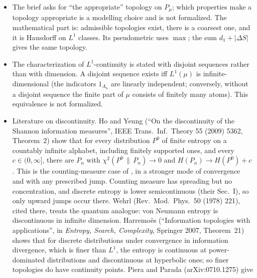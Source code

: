 \documentclass[11pt]{article}
\begin{document}
\begin{itemize}
  mixture $(\rho, \sigma) \mapsto (\rho+\sigma)/2$ is continuous. That is weaker than the
  brief's hypothesis that all mixing is continuous, so the formal statement is stronger. The
   forms take the brief's hypothesis literally, reading ``statistical
  mixing (e.g.\ $(\lambda, \rho, \sigma) \mapsto \lambda\rho + (1-\lambda)\sigma$)'' as this
  map $[0, 1] \times P_\mu \times P_\mu \to P_\mu$ (), with the product
  topology. They follow by fixing $\lambda = \tfrac12$.
\item The brief asks for ``the appropriate'' topology on $P_\mu$; which properties make a
  topology appropriate is a modelling choice and is not formalized. The mathematical part is:
  admissible topologies exist, there is a coarsest one, and it is Hausdorff on $L^1$ classes.
  Its pseudometric uses $\max$; the sum $d_1 + |\Delta S|$ gives the same topology.
\item The characterization of $L^1$-continuity is stated with disjoint sequences rather than
  with dimension. A disjoint sequence exists iff $L^1(\mu)$ is infinite-dimensional (the
  indicators $1_{A_n}$ are linearly independent; conversely, without a disjoint sequence the
  finite part of $\mu$ consists of finitely many atoms). This equivalence is not formalized.
\item Literature on discontinuity. Ho and Yeung (``On the discontinuity of the Shannon
  information measures'', IEEE Trans.\ Inf.\ Theory 55 (2009) 5362, Theorem~2) show that for
  every distribution $P^0$ of finite entropy on a countably infinite alphabet, including finitely
  supported ones, and every $c \in (0, \infty]$, there are $P_n$ with
  $\chi^2(P^0 \,\|\, P_n) \to 0$ and $H(P_n) \to H(P^0) + c$. This is the counting-measure case of
  , in a stronger mode of convergence and with any prescribed
  jump. Counting measure has spreading but no concentration, and discrete entropy is lower
  semicontinuous (their Sec.~I), so only upward jumps occur there. Wehrl (Rev.\ Mod.\ Phys.\ 50
  (1978) 221), cited there, treats the quantum analogue: von Neumann entropy is discontinuous in
  infinite dimension. Harremoës (``Information topologies with applications'', in
  \emph{Entropy, Search, Complexity}, Springer 2007, Theorem~21) shows that for discrete
  distributions under convergence in information divergence, which is finer than $L^1$, the
  entropy is continuous at power-dominated distributions and discontinuous at hyperbolic ones;
  so finer topologies do have continuity points. Piera and Parada (arXiv:0710.1275) give

\end{itemize}
\end{document}
